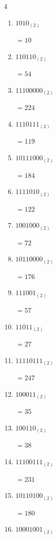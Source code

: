\begin{multicols}{4}
\begin{enumerate}
        $=71$

  \item $1010_{(2)}$

        $=10$

  \item $110110_{(2)}$

        $=54$

  \item $11100000_{(2)}$

        $=224$

  \item $1110111_{(2)}$

        $=119$

  \item $10111000_{(2)}$

        $=184$

  \item $1111010_{(2)}$

        $=122$

  \item $1001000_{(2)}$

        $=72$

\columnbreak %

  \item $10110000_{(2)}$

        $=176$

  \item $111001_{(2)}$

        $=57$

  \item $11011_{(2)}$

        $=27$

  \item $11110111_{(2)}$

        $=247$

  \item $100011_{(2)}$

        $=35$

  \item $100110_{(2)}$

        $=38$

  \item $11100111_{(2)}$

        $=231$

  \item $10110100_{(2)}$

        $=180$

  \item $10001001_{(2)}$


\end{enumerate}
\end{multicols}
